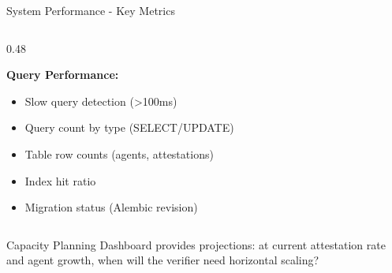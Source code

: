 \begin{frame}{System Performance - Key Metrics}
\begin{columns}[T]
\begin{column}{0.48\textwidth}
      \vspace{0.1cm}

      \textbf{Query Performance:}
      \begin{itemize}
        \item Slow query detection (>100ms)
        \item Query count by type (SELECT/UPDATE)
        \item Table row counts (agents, attestations)
        \item Index hit ratio
        \item Migration status (Alembic revision)
      \end{itemize}
    \end{column}
  \end{columns}

  \vspace{0.2cm}

  \begin{alertblock}{Capacity Planning}
    \scriptsize
    Dashboard provides projections: at current attestation rate and agent growth,
    when will the verifier need horizontal scaling?
  \end{alertblock}
\end{frame}

